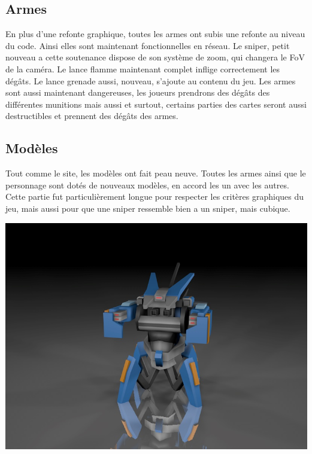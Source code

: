 ﻿\documentclass[12pt]{article}
\begin{document}
\subsection {Armes}
En plus d'une refonte graphique, toutes les armes ont subis une refonte au niveau du code. Ainsi elles sont
maintenant fonctionnelles en réseau. Le sniper, petit nouveau a cette soutenance dispose de son système de zoom,
qui changera le FoV de la caméra. Le lance flamme maintenant complet inflige correctement les dégâts.
Le lance grenade aussi, nouveau, s'ajoute au contenu du jeu. Les armes sont aussi maintenant dangereuses,
les joueurs prendrons des dégâts des différentes munitions mais aussi et surtout, certains parties des 
cartes seront aussi destructibles et prennent des dégâts des armes.


\subsection {Modèles}
Tout comme le site, les modèles ont fait peau neuve. Toutes les armes ainsi que le personnage sont dotés
de nouveaux modèles, en accord les un avec les autres. Cette partie fut particulièrement longue pour
respecter les critères graphiques du jeu, mais aussi pour que une sniper ressemble bien a un sniper, 
mais cubique.

\centerline{\includegraphics[scale=0.5]{NewPlayer.jpg}}
\end{document}
